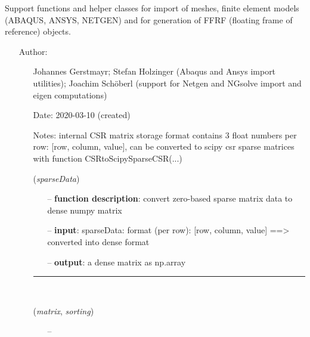 \begin{itemize}[leftmargin=1.4cm]
\begin{itemize}[leftmargin=1.4cm]
\begin{itemize}[leftmargin=1.4cm]
\begin{itemize}[leftmargin=0.5cm]
\begin{itemize}[leftmargin=1.4cm]
%
\label{sec:module:FEM}
  Support functions and helper classes for import of meshes, finite element models (ABAQUS, ANSYS, NETGEN) and for generation of FFRF (floating frame of reference) objects.
\begin{itemize}[leftmargin=1.4cm]
\setlength{\itemindent}{-1.4cm}
\item[]Author:
\vspace{-22pt}\begin{itemize}[leftmargin=0.5cm]
\setlength{\itemindent}{-0.5cm}
\item[]   Johannes Gerstmayr; Stefan Holzinger (Abaqus and Ansys import utilities); Joachim Sch\"oberl (support for Netgen and NGsolve \cite{Schoeberl1997,NGsolve2014,NGsolve2022} import and eigen computations) 
\ei
\item[]Date:      2020-03-10 (created)
\item[]Notes:     internal CSR matrix storage format contains 3 float numbers per row: [row, column, value], can be converted to scipy csr sparse matrices with function CSRtoScipySparseCSR(...)
\ei
\begin{flushleft}
\label{sec:FEM:CompressedRowSparseToDenseMatrix}
({\it sparseData})
\end{flushleft}
\setlength{\itemindent}{0.7cm}
\begin{itemize}[leftmargin=0.7cm]
\item[--]
{\bf function description}: convert zero-based sparse matrix data to dense numpy matrix
\item[--]
{\bf input}: sparseData: format (per row): [row, column, value] ==> converted into dense format
\item[--]
{\bf output}: a dense matrix as np.array
\vspace{12pt}\end{itemize}
%
\noindent\rule{8cm}{0.75pt}\vspace{1pt} \\ 
\begin{flushleft}
\label{sec:FEM:MapSparseMatrixIndices}
({\it matrix}, {\it sorting})
\end{flushleft}
\setlength{\itemindent}{0.7cm}
\begin{itemize}[leftmargin=0.7cm]
\item[--]

\end{itemize}
\end{itemize}
\end{itemize}
\end{itemize}
\end{itemize}
\end{itemize}
\end{itemize}
\end{itemize}
